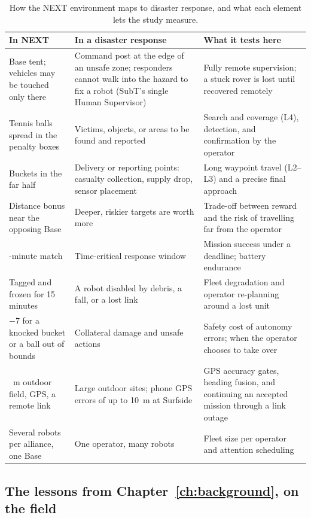 \begin{table}[ht]
\centering
\small
\caption{How the NEXT environment maps to disaster response, and what each element lets the study measure.}
\label{tab:next-mapping}
\begin{tabularx}{\textwidth}{@{}>{\raggedright\arraybackslash}p{2.9cm} >{\raggedright\arraybackslash}X >{\raggedright\arraybackslash}X@{}}
\toprule
In NEXT & In a disaster response & What it tests here \\
\midrule
Base tent; vehicles may be touched only there & Command post at the edge of an unsafe zone; responders cannot walk into the hazard to fix a robot (SubT's single Human Supervisor) & Fully remote supervision; a stuck rover is lost until recovered remotely \\
Tennis balls spread in the penalty boxes & Victims, objects, or areas to be found and reported & Search and coverage (L4), detection, and confirmation by the operator \\
Buckets in the far half & Delivery or reporting points: casualty collection, supply drop, sensor placement & Long waypoint travel (L2--L3) and a precise final approach \\
Distance bonus near the opposing Base & Deeper, riskier targets are worth more & Trade-off between reward and the risk of travelling far from the operator \\
90-minute match & Time-critical response window & Mission success under a deadline; battery endurance \\
Tagged and frozen for 15 minutes & A robot disabled by debris, a fall, or a lost link & Fleet degradation and operator re-planning around a lost unit \\
$-7$ for a knocked bucket or a ball out of bounds & Collateral damage and unsafe actions & Safety cost of autonomy errors; when the operator chooses to take over \\
100~m outdoor field, GPS, a remote link & Large outdoor sites; phone GPS errors of up to 10~m at Surfside & GPS accuracy gates, heading fusion, and continuing an accepted mission through a link outage \\
Several robots per alliance, one Base & One operator, many robots & Fleet size per operator and attention scheduling \\
\bottomrule
\end{tabularx}
\end{table}

\subsection{The lessons from Chapter~\ref{ch:background}, on the field}

